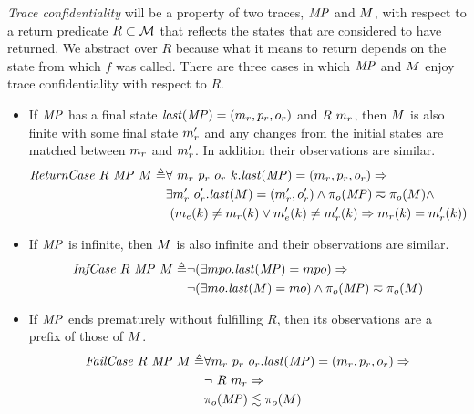 \documentclass[acmsmall,review,anonymous]{acmart}\settopmatter{printfolios=true,printccs=false,printacmref=false}
\begin{document}

{\em Trace confidentiality} will be a property of two traces, \(\mathit{MP}\) and
\(M\), with respect to a return predicate \(R \subset {\mathcal M}\) that
reflects the states that are considered to have returned. We abstract over
\(R\) because what it means to return depends on the state from which
\(f\) was called. There are three cases in which \(\mathit{MP}\) and \(M\)
enjoy trace confidentiality with respect to \(R\).

\begin{itemize}
  \item If \(\mathit{MP}\) has a final state \(\mathit{last}(\mathit{MP}) = (m_r,p_r,o_r)\) and \(R\ \mach_r\), then \(M\) is also finite with
    some final state \(m_r'\) and any changes from the initial states are
    matched between \(m_r\) and \(m_r'\). In addition their
    observations are similar.
    \[\begin{split}
      \mathit{ReturnCase} ~ R ~ \mathit{MP} ~ M \triangleq &
      \forall ~ m_r ~ p_r ~ o_r ~ k . \mathit{last}(\mathit{MP}) =
        (m_r,p_r,o_r) \Rightarrow \\
      & \exists m_r' ~ o_r' . \mathit{last}(M) = (m_r',o_r')
        \land \pi_o(\mathit{MP}) \eqsim \pi_o(M) \land \\
      & ~ (m_e(k) \not = m_r(k)
        \lor m_e'(k) \not = m_r'(k) \Rightarrow
      m_r(k) = m_r'(k))
    \end{split}\]
  \item If \(\mathit{MP}\) is infinite, then \(M\) is also infinite and their
  observations are similar.
    \[\begin{split}
      \mathit{InfCase} ~ R ~ \mathit{MP} ~ M \triangleq
      & \neg (\exists mpo . \mathit{last}(\mathit{MP}) = mpo) \Rightarrow \\
      & \neg (\exists mo . \mathit{last}(M) = mo)
        \land \pi_o(\mathit{MP}) \eqsim \pi_o(M)
    \end{split}\]
\item If \(\mathit{MP}\) ends prematurely without fulfilling \(R\), then
  its observations are a prefix of those of \(M\).
    \[\begin{split}
      \mathit{FailCase} ~ R ~ \mathit{MP} ~ M \triangleq
      & \forall m_r ~ p_r ~ o_r .
        \mathit{last}(\mathit{MP}) = (m_r,p_r,o_r) \Rightarrow \\
      & \neg ~ R ~ m_r \Rightarrow \\
      & \pi_o(\mathit{MP}) \lesssim \pi_o(M)
    \end{split}\]
\end{itemize}
\end{document}
